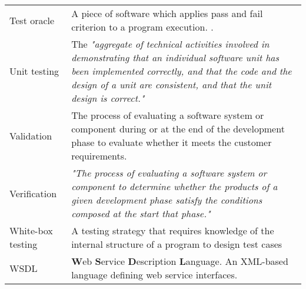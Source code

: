\documentclass[12pt,a4paper,oneside,pdftex]{report}
\begin{document}
\begin{longtable}{@{}p{}p{}@{}}
Test oracle & A piece of software which applies pass and fail criterion to a program execution. \citep{pezze2008software}. \\[0.3cm] 

Unit testing & The \emph{"aggregate of technical activities involved in demonstrating that an individual software unit has been implemented correctly, and that the code and the design of a unit are consistent, and that the unit design is correct."} \citep{burnstein2003practical} \\[0.3cm]

Validation & The process of evaluating a software system or component during or at the end of the development phase to evaluate whether it meets the customer requirements. \citep{ieee2010systems} \\[0.3cm]

Verification & \emph{"The process of evaluating a software system or component to determine whether the products of a given development phase satisfy the conditions composed at the start that phase."} \citep{ieee2010systems} \\[0.3cm]

White-box testing & A testing strategy that requires knowledge of the internal structure of a program to design test cases \citep{burnstein2003practical} \\[0.3cm]

WSDL & \textbf{W}eb \textbf{S}ervice \textbf{D}escription \textbf{L}anguage. An XML-based language defining web service interfaces. \citep{christensen2001web} \\[0.3cm]

\end{longtable}

\cleardoublepage
\tableofcontents


\end{document}
